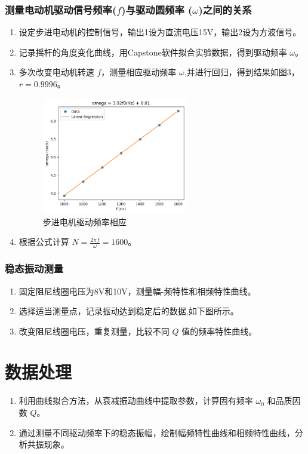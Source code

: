 \documentclass[UTF8]{ctexart}
\begin{document}
\subsubsection{测量电动机驱动信号频率($f$)与驱动圆频率 ($\omega$)之间的关系}
\begin{enumerate}
    \item 设定步进电动机的控制信号，输出1设为直流电压15V，输出2设为方波信号。
    \item 记录摇杆的角度变化曲线，用Capstone软件拟合实验数据，得到驱动频率 $\omega$。
    \item 多次改变电动机转速 $f$，测量相应驱动频率 $\omega$,并进行回归，得到结果如图3，\(r=0.9996\)。
    \begin{figure}[htbp]
        \centering
        \includegraphics[width=0.6\textwidth]{drive.png}
        \caption{步进电机驱动频率相应}
        \label{fig:drive}
    \end{figure}
    
    \item 根据公式计算 $N = \frac{2\pi f}{\omega}=1600$。
\end{enumerate}

\subsubsection{稳态振动测量}
\begin{enumerate}
    \item 固定阻尼线圈电压为8V和10V，测量幅-频特性和相频特性曲线。
    \item 选择适当测量点，记录振动达到稳定后的数据,如下图所示。
    \item 改变阻尼线圈电压，重复测量，比较不同 $Q$ 值的频率特性曲线。
\end{enumerate}

\section{数据处理}
\begin{enumerate}
    \item 利用曲线拟合方法，从衰减振动曲线中提取参数，计算固有频率 $\omega_0$ 和品质因数 $Q$。
    \item 通过测量不同驱动频率下的稳态振幅，绘制幅频特性曲线和相频特性曲线，分析共振现象。
\end{enumerate}
\end{document}
